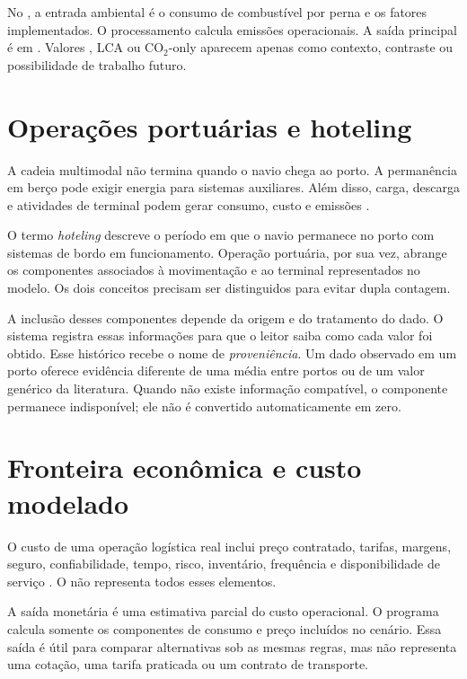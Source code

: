 No \CabotageLens{}, a entrada ambiental é o consumo de combustível por perna e os fatores implementados. O processamento calcula emissões operacionais. A saída principal é \ttw{} em \cooe{}. Valores \wtw{}, LCA ou CO$_2$-only aparecem apenas como contexto, contraste ou possibilidade de trabalho futuro.

\section{Operações portuárias e hoteling}
\label{sec:portos-hoteling-literatura}

A cadeia multimodal não termina quando o navio chega ao porto. A permanência em berço pode exigir energia para sistemas auxiliares. Além disso, carga, descarga e atividades de terminal podem gerar consumo, custo e emissões \cite{berth2009,shipops2022,berthairquality2010}.

O termo \emph{hoteling} descreve o período em que o navio permanece no porto com sistemas de bordo em funcionamento. Operação portuária, por sua vez, abrange os componentes associados à movimentação e ao terminal representados no modelo. Os dois conceitos precisam ser distinguidos para evitar dupla contagem.

A inclusão desses componentes depende da origem e do tratamento do dado. O sistema registra essas informações para que o leitor saiba como cada valor foi obtido. Esse histórico recebe o nome de \emph{proveniência}. Um dado observado em um porto oferece evidência diferente de uma média entre portos ou de um valor genérico da literatura. Quando não existe informação compatível, o componente permanece indisponível; ele não é convertido automaticamente em zero.

\section{Fronteira econômica e custo modelado}
\label{sec:custo-modelado-literatura}

O custo de uma operação logística real inclui preço contratado, tarifas, margens, seguro, confiabilidade, tempo, risco, inventário, frequência e disponibilidade de serviço \cite{competitiveness2024,modalshiftreview2020}. O \CabotageLens{} não representa todos esses elementos.

A saída monetária é uma estimativa parcial do custo operacional. O programa calcula somente os componentes de consumo e preço incluídos no cenário. Essa saída é útil para comparar alternativas sob as mesmas regras, mas não representa uma cotação, uma tarifa praticada ou um contrato de transporte.

